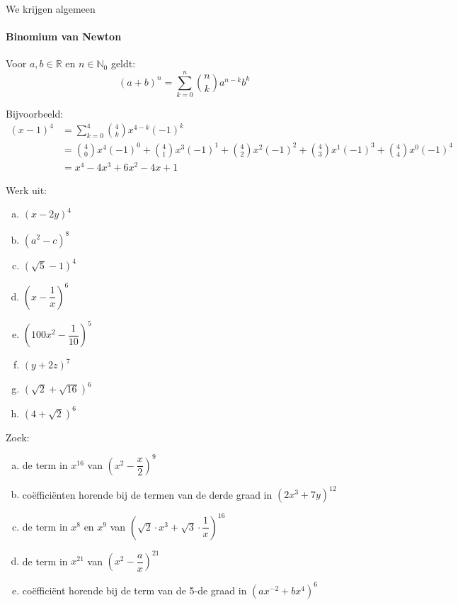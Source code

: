 \documentclass[12pt,a4,twoside]{article}
\begin{document}
We krijgen algemeen
\paragraph{Binomium van Newton}
\begin{mdframed}
Voor $a,b\in\mathbb{R}$ en $n\in\mathbb{N}_0$ geldt:
$$(a+b)^n=\sum^n_{k=0}{n \choose k}a^{n-k}b^k$$
\end{mdframed}

Bijvoorbeeld:
\begin{align*}\displaystyle
  (x-1)^4 &= \sum^4_{k=0}{4 \choose k}x^{4-k}(-1)^k\\
          &= {4 \choose 0}x^4(-1)^0 + {4 \choose 1}x^3(-1)^1+{4 \choose 2}x^2(-1)^2+{4 \choose 3}x^1(-1)^3+{4 \choose 4}x^0(-1)^4\\
          &=x^4-4x^3+6x^2-4x+1
\end{align*}

\begin{oefening}
Werk uit:
\begin{multicols}{3}
\begin{enumerate}[(a)]
  \item $\left(x-2y\right)^4$
  \item $\left(a^2-c\right)^8$
  \item $\left(\sqrt{5}-1\right)^4$
  \item $\left(x-\dfrac{1}{x}\right)^6$
  \item $\left(100x^2-\dfrac{1}{10}\right)^5$
  \item $\left(y+2z\right)^7$
  \item $\left(\sqrt{2}+\sqrt{16}\right)^6$
  \item $\left(4+\sqrt{2}\right)^6$
\end{enumerate}
\end{multicols}
\end{oefening}

\begin{oefening}
Zoek:
\begin{enumerate}[(a)]
  \itemsep.5em
  \item de term in $x^{16}$ van $\left(x^2-\dfrac{x}{2}\right)^9$
  \item coëfficiënten horende bij de termen van de derde graad in $\left(2x^3+7y\right)^{12}$
  \item de term in $x^{8}$ en $x^9$ van $\left(\sqrt{2}\cdot x^3+\sqrt{3}\cdot \dfrac{1}{x}\right)^{16}$
  \item de term in $x^{21}$ van $\left(x^2-\dfrac{a}{x}\right)^{21}$
  \item coëfficiënt horende bij de term van de 5-de graad in $\left(ax^{-2}+bx^4\right)^{6}$
\end{enumerate}
\end{oefening}
\end{document}
